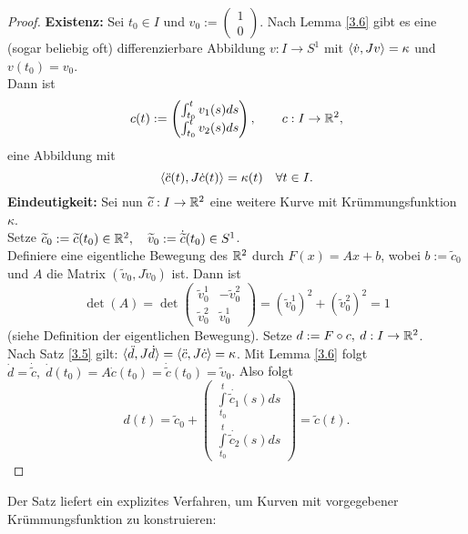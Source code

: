 \documentclass[11pt]{scrbook}
\begin{document}
\begin{st}
\begin{proof}
\textbf{Existenz:}
Sei $t_0 \in I$ und $v_0 := \begin{pmatrix} 1 \\ 0 \end{pmatrix}$. Nach Lemma \ref{3.6} gibt es eine (sogar beliebig oft) differenzierbare Abbildung $v : I \to S^1$ mit $\langle \dot v, Jv \rangle = \kappa$ und $v(t_0) = v_0$. \\
Dann ist
\[ c(t) := \begin{pmatrix}  \int_{t_0}^t v_1(s) ds \\ \int_{t_0}^t v_2(s) ds \end{pmatrix} , \qquad c:I \to \mathbb{R}^2, \]
eine Abbildung mit 
\[ \langle \ddot c(t), J \dot c(t) \rangle = \kappa(t) \quad \forall t \in I. \]
\textbf{Eindeutigkeit:}
Sei nun $\widetilde c: I \to \mathbb{R}^2$ eine weitere Kurve mit Krümmungsfunktion $\kappa$.\\ Setze $\widetilde c_0 := \widetilde c(t_0) \in \mathbb{R}^2, \quad \widetilde v_0 := \dot{\widetilde c}(t_0) \in S^1$. \\
Definiere eine eigentliche Bewegung des $\mathbb{R}^2$ durch $F(x) = Ax + b$, wobei $b := \tilde c_0$ und $A$ die Matrix $(\tilde v_0, J \tilde v_0)$ ist. Dann ist
\[ \det(A) = \det \begin{pmatrix} \tilde v_0^1 & - \tilde v_0^2 \\ \tilde v_0^2 & \tilde v_0^1 \end{pmatrix} = (\tilde v_0^1)^2 + (\tilde v_0^2)^2 = 1 \]
(siehe Definition der eigentlichen Bewegung). Setze $d := F \circ c, \: d: I \to \mathbb{R}^2$. \\
Nach Satz \ref{3.5} gilt: $ \langle \ddot d, J \dot d \rangle = \langle \ddot c, J \dot c \rangle = \kappa$. Mit Lemma \ref{3.6} folgt $ \dot d = \dot{\tilde c}, \; \dot d(t_0) = A \dot c(t_0) = \dot{\tilde c}(t_0) = \tilde v_0$.
Also folgt
\[ d(t) = \tilde c_0 + \begin{pmatrix}  \int\limits_{t_0}^t \dot{\tilde c_1}(s) ds \\ \int\limits_{t_0}^t \dot{\tilde c_2}(s) ds \end{pmatrix} = \tilde c(t). \]
\end{proof}
\end{st}

Der Satz liefert ein explizites Verfahren, um Kurven mit vorgegebener Krümmungsfunktion zu konstruieren:
\end{document}
